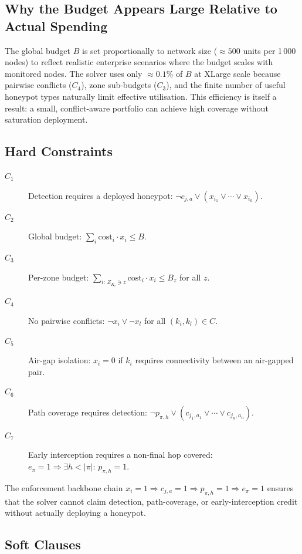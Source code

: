 \documentclass[journal]{IEEEtran}
\begin{document}
\subsection{Why the Budget Appears Large Relative to Actual Spending}
\label{sec:model:budget}

The global budget $B$ is set proportionally to network size
(${\approx}500$ units per 1\,000 nodes) to reflect realistic enterprise
scenarios where the budget scales with monitored nodes. The solver uses
only ${\approx}0.1\%$ of $B$ at XLarge scale because pairwise conflicts
($C_4$), zone sub-budgets ($C_3$), and the finite number of useful
honeypot types naturally limit effective utilisation. This efficiency
is itself a result: a small, conflict-aware portfolio can achieve high
coverage without saturation deployment.

\subsection{Hard Constraints}
\label{sec:model:hard}

\begin{description}
  \item[$C_1$] Detection requires a deployed honeypot:
    $\neg c_{j,a}\vee(x_{i_1}\vee\cdots\vee x_{i_k})$.
  \item[$C_2$] Global budget:
    $\sum_i\mathrm{cost}_i\cdot x_i\leq B$.
  \item[$C_3$] Per-zone budget:
    $\sum_{i:\,Z_{K_i}\ni z}\mathrm{cost}_i\cdot x_i\leq B_z$
    for all $z$.
  \item[$C_4$] No pairwise conflicts:
    $\neg x_i\vee\neg x_l$ for all $(k_i,k_l)\in C$.
  \item[$C_5$] Air-gap isolation:
    $x_i=0$ if $k_i$ requires connectivity between an air-gapped pair.
  \item[$C_6$] Path coverage requires detection:
    $\neg p_{\pi,h}\vee(c_{j_1,a_1}\vee\cdots\vee c_{j_n,a_n})$.
  \item[$C_7$] Early interception requires a non-final hop covered:
    $e_\pi=1\Rightarrow\exists h<|\pi|:\,p_{\pi,h}=1$.
\end{description}

The enforcement backbone chain
$x_i=1\Rightarrow c_{j,a}=1\Rightarrow p_{\pi,h}=1\Rightarrow e_\pi=1$
ensures that the solver cannot claim detection, path-coverage, or
early-interception credit without actually deploying a honeypot.

\subsection{Soft Clauses}
\label{sec:model:soft}
\end{document}
